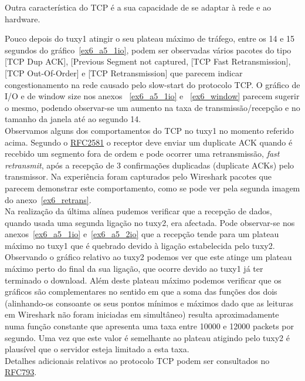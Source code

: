 \documentclass[11pt,a4paper,reqno]{report}
\numberwithin{equation}{section}
\begin{document}
Outra característica do TCP é a sua capacidade de se adaptar à rede e ao hardware.

Pouco depois do tuxy1 atingir o seu plateau máximo de tráfego, entre os 14 e 15 segundos do gráfico~\ref{ex6_a5_1io}, podem ser observadas vários pacotes do tipo [TCP Dup ACK], [Previous Segment not captured, [TCP Fast Retransmission], [TCP Out-Of-Order] e [TCP Retransmission] que parecem indicar congestionamento na rede causado pelo slow-start do protocolo TCP. O gráfico de I/O e de window size nos anexos ~\ref{ex6_a5_1io} e ~\ref{ex6_window} parecem sugerir o mesmo, podendo observar-se um aumento na taxa de transmissão/recepção e no tamanho da janela até ao segundo 14.\\

Observamos alguns dos comportamentos do TCP no tuxy1 no momento referido acima. Segundo o \href{http://www.ietf.org/rfc/rfc2581.txt}{RFC2581} o receptor deve enviar um duplicate ACK quando é recebido um segmento fora de ordem e pode ocorrer uma retransmissão, \emph{fast retransmit}, após a recepção de 3 confirmações duplicadas (duplicate ACKs) pelo transmissor. Na experiência foram capturados pelo Wireshark pacotes que parecem demonstrar este comportamento, como se pode ver pela segunda imagem do anexo~\ref{ex6_retrans}.\\

Na realização da última alínea pudemos verificar que a recepção de dados, quando usada uma segunda ligação no tuxy2, era afectada. Pode observar-se nos anexos~\ref{ex6_a5_1io} e~\ref{ex6_a5_2io} que a recepção  tende para um plateau máximo no tuxy1 que é quebrado devido à ligação estabelecida pelo tuxy2. Observando o gráfico relativo ao tuxy2 podemos ver que este atinge um plateau máximo perto do final da sua ligação, que ocorre devido ao tuxy1 já ter terminado o download. Além deste plateau máximo podemos verificar que os gráficos são complementares no sentido em que a soma das funções dos dois (alinhando-os consoante os seus pontos mínimos e máximos dado que as leituras em Wireshark não foram iniciadas em simultâneo) resulta aproximadamente numa função constante que apresenta uma taxa entre 10000 e 12000 packets por segundo. Uma vez que este valor é semelhante ao plateau atigindo pelo tuxy2 é plausível que o servidor esteja limitado a esta taxa.\\

Detalhes adicionais relativos ao protocolo TCP podem ser consultados no \href{https://www.ietf.org/rfc/rfc793.txt}{RFC793}.
\end{document}
